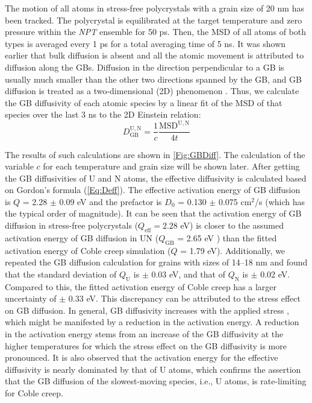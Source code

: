 \documentclass[preprint, 12pt]{elsarticle}
\newcommand{\?}{\stackrel{?}{=}}
\begin{document}
The motion of all atoms in stress-free polycrystals with a grain size of 20 nm has been tracked. The polycrystal is equilibrated at the target temperature and zero pressure within the \textit{NPT} ensemble for 50 ps. Then, the MSD of all atoms of both types is averaged every 1 ps for a total averaging time of 5 ns. It was shown earlier that bulk diffusion is absent and all the atomic movement is attributed to diffusion along the GBs. Diffusion in the direction perpendicular to a GB is usually much smaller than the other two directions spanned by the GB, and GB diffusion is treated as a two-dimensional (2D) phenomenon \cite{Riet2021}. Thus, we calculate the GB diffusivity of each atomic species by a linear fit of the MSD of that species over the last 3 ns to the 2D Einstein relation:
\begin{equation}
D_\mathrm{GB}^\mathrm{U, N} = \frac{1}{c} \frac{\mathrm{MSD^\mathrm{U, N}}}{4 t}
\label{Eq:GBD}
\end{equation}

The results of such calculations are shown in \cref{Fig:GBDiff}. The calculation of the variable $c$ for each temperature and grain size will be shown later. After getting the GB diffusivities of U and N atoms, the effective diffusivity is calculated based on Gordon's formula (\cref{Eq:Deff}). The effective activation energy of GB diffusion is $Q$ = 2.28 $\pm$ 0.09 eV and the prefactor is $D_0$ = 0.130 $\pm$ 0.075 cm$^2$/s (which has the typical order of magnitude). It can be seen that the activation energy of GB diffusion in stress-free polycrystals ($Q_{\mathrm{eff}} = 2.28$ eV) is closer to the assumed activation energy of GB diffusion in UN ($Q_\mathrm{GB}$ = 2.65 eV \cite{Konovalov2016}) than the fitted activation energy of Coble creep simulation ($Q$ = 1.79 eV). Additionally, we repeated the GB diffusion calculation for grains with sizes of 14--18 nm and found that the standard deviation of $Q_\mathrm{U}$ is $\pm$ 0.03 eV, and that of $Q_\mathrm{N}$ is $\pm$ 0.02 eV. Compared to this, the fitted activation energy of Coble creep has a larger uncertainty of $\pm$ 0.33 eV. This discrepancy can be attributed to the stress effect on GB diffusion. In general, GB diffusivity increases with the applied stress \cite{Haslam2004}, which might be manifested by a reduction in the activation energy. A reduction in the activation energy stems from an increase of the GB diffusivity at the higher temperatures for which the stress effect on the GB diffusivity is more pronounced. It is also observed that the activation energy for the effective diffusivity is nearly dominated by that of U atoms, which confirms the assertion that the GB diffusion of the slowest-moving species, i.e., U atoms, is rate-limiting for Coble creep.
\end{document}
